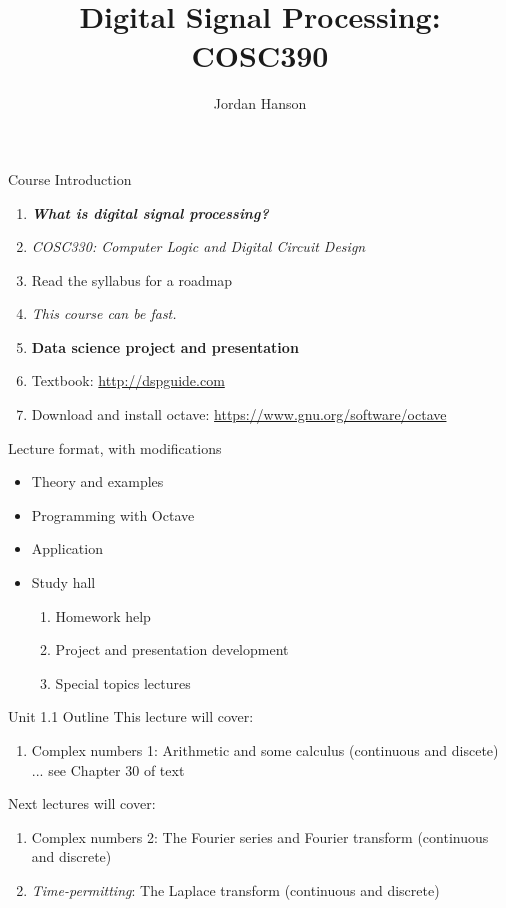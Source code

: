 \documentclass{beamer}
\title{Digital Signal Processing: COSC390}
\author{Jordan Hanson}
\institute{Whittier College Department of Physics and Astronomy}
\begin{document}
\maketitle

\begin{frame}{Course Introduction}
\begin{enumerate}
\item\textit{ \textbf{\alert{What is digital signal processing?}}}
\item \textit{COSC330: Computer Logic and Digital Circuit Design}
\item Read the syllabus for a roadmap
\item \textit{This course can be fast.}
\item \textbf{Data science project and presentation}
\item Textbook: \url{http://dspguide.com}
\item Download and install octave: \url{https://www.gnu.org/software/octave}
\end{enumerate}
\end{frame}

\begin{frame}{Lecture format, with modifications}
\begin{itemize}
\item Theory and examples
\item Programming with Octave
\item Application
\item Study hall
\begin{enumerate}
\item Homework help
\item Project and presentation development
\item Special topics lectures
\end{enumerate}
\end{itemize}
\end{frame}

\begin{frame}{Unit 1.1 Outline}
This lecture will cover:
\begin{enumerate}
\item \alert{Complex numbers 1: Arithmetic and some calculus (continuous and discete) ... see Chapter 30 of text}
\end{enumerate}
Next lectures will cover:
\begin{enumerate}
\item Complex numbers 2: The Fourier series and Fourier transform (continuous and discrete)
\item \textit{Time-permitting}: The Laplace transform (continuous and discrete)
\end{enumerate}
\end{frame}
\end{document}
